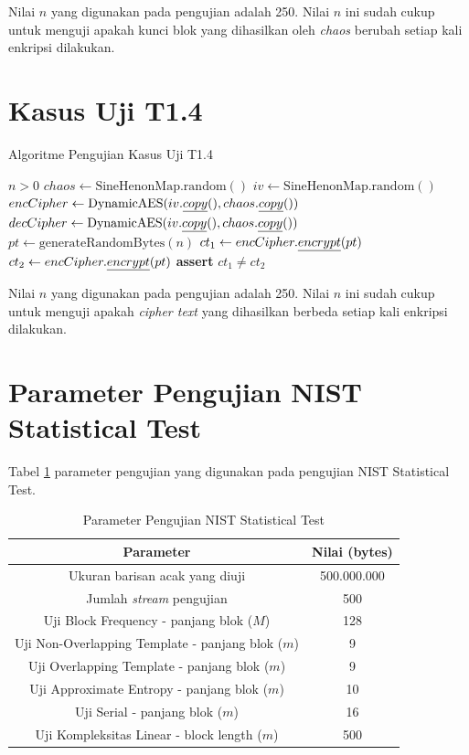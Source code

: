 Nilai $n$ yang digunakan pada pengujian adalah 250. Nilai $n$ ini sudah cukup untuk menguji apakah kunci blok yang dihasilkan oleh \emph{chaos} berubah setiap kali enkripsi dilakukan.

\section{Kasus Uji T1.4}

\begin{algorithm}
  \caption{Algoritme Pengujian Kasus Uji T1.4}
  \label{alg:unit.test.t1.4}
  \begin{algorithmic}
    \Require $n > 0$
    \State $chaos \gets \text{SineHenonMap.random}()$ 
    \State $iv \gets \text{SineHenonMap.random}()$
    \State $encCipher \gets \text{DynamicAES}(iv.\emph{copy}(), chaos.\emph{copy}())$
    \State $decCipher \gets \text{DynamicAES}(iv.\emph{copy}(), chaos.\emph{copy}())$
    \State
    \State $pt \gets \text{generateRandomBytes}(n)$ 
    \State $ct_1 \gets encCipher.\emph{encrypt}(pt)$
    \State $ct_2 \gets encCipher.\emph{encrypt}(pt)$
    \State
    \State \textbf{assert} $ct_1 \ne ct_2$
  \end{algorithmic}
\end{algorithm}

Nilai $n$ yang digunakan pada pengujian adalah 250. Nilai $n$ ini sudah cukup untuk menguji apakah \emph{cipher text} yang dihasilkan berbeda setiap kali enkripsi dilakukan.

\section{Parameter Pengujian NIST Statistical Test}

Tabel \ref{tab:param.statistic.test} parameter pengujian yang digunakan pada pengujian NIST Statistical Test.

\begin{table}[h]
  \centering
  \caption{Parameter Pengujian NIST Statistical Test}
  \label{tab:param.statistic.test}
  \begin{tabular}{|c|c|}
    \hline
    \textbf{Parameter} & \textbf{Nilai (bytes)} \\
    \hline
    {Ukuran barisan acak yang diuji} & 500.000.000 \\
    \hline
    {Jumlah \emph{stream} pengujian} & 500 \\
    \hline
    {Uji Block Frequency - panjang blok ($M$)} & 128 \\
    \hline
    {Uji Non-Overlapping Template - panjang blok ($m$)} & 9 \\
    \hline
    {Uji Overlapping Template - panjang blok ($m$)} & 9 \\
    \hline
    {Uji Approximate Entropy - panjang blok ($m$)} & 10 \\
    \hline
    {Uji Serial - panjang blok ($m$)} & 16 \\
    \hline
    {Uji Kompleksitas Linear - block length ($m$)} & 500 \\
    \hline
  \end{tabular}
\end{table}

